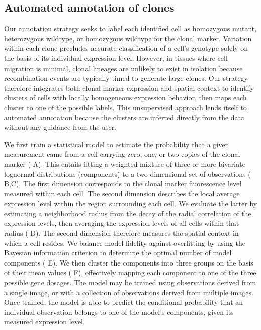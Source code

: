 \documentclass[10pt,letterpaper]{article}
\begin{document}
\subsection*{Automated annotation of clones}
\label{ch:annotation}

Our annotation strategy seeks to label each identified cell as homozygous mutant, heterozygous wildtype, or homozygous wildtype for the clonal marker. Variation within each clone precludes accurate classification of a cell's genotype solely on the basis of its individual expression level. However, in tissues where cell migration is minimal, clonal lineages are unlikely to exist in isolation because recombination events are typically timed to generate large clones. Our strategy therefore integrates both clonal marker expression and spatial context to identify clusters of cells with locally homogeneous expression behavior, then maps each cluster to one of the possible labels. This unsupervised approach lends itself to automated annotation because the clusters are inferred directly from the data without any guidance from the user.

We first train a statistical model to estimate the probability that a given measurement came from a cell carrying zero, one, or two copies of the clonal marker ( A). This entails fitting a weighted mixture of three or more bivariate lognormal distributions (components) to a two dimensional set of observations ( B,C). The first dimension corresponds to the clonal marker fluorescence level measured within each cell. The second dimension describes the local average expression level within the region surrounding each cell. We evaluate the latter by estimating a neighborhood radius from the decay of the radial correlation of the expression levels, then averaging the expression levels of all cells within that radius ( D). The second dimension therefore measures the spatial context in which a cell resides. We balance model fidelity against overfitting by using the Bayesian information criterion to determine the optimal number of model components ( E). We then cluster the components into three groups on the basis of their mean values ( F), effectively mapping each component to one of the three possible gene dosages. The model may be trained using observations derived from a single image, or with a collection of observations derived from multiple images. Once trained, the model is able to predict the conditional probability that an individual observation belongs to one of the model's components, given its measured expression level.
\end{document}
